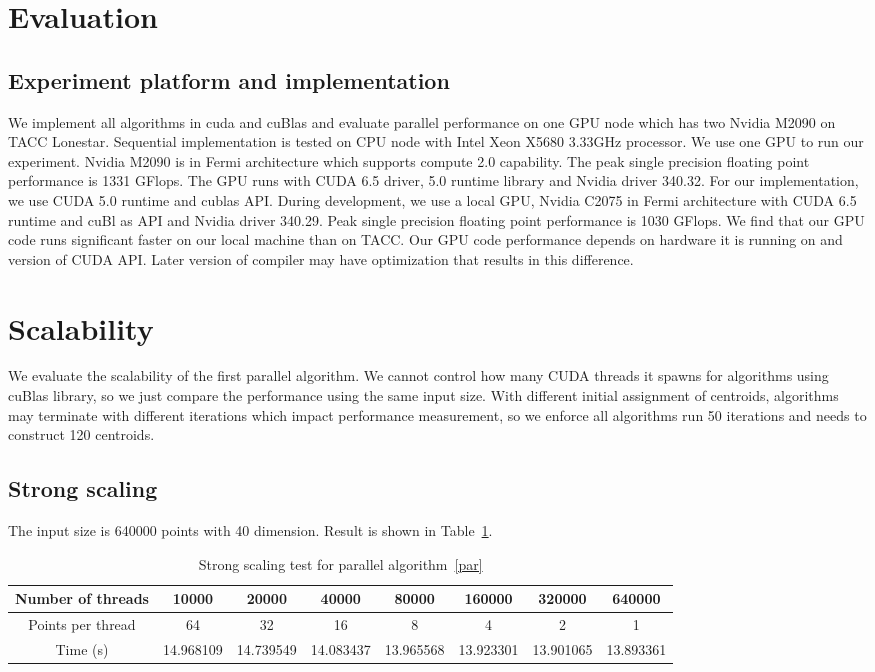 \section{Evaluation}
\subsection{Experiment platform and implementation}
We implement all algorithms in cuda and cuBlas and evaluate parallel performance on one GPU node which
has two Nvidia M2090 on TACC Lonestar. Sequential implementation is tested on CPU node with
Intel Xeon X5680 3.33GHz processor. We use one GPU to run our experiment. Nvidia M2090 is in Fermi
architecture which supports compute 2.0 capability. The peak single precision floating point performance
is 1331 GFlops. The GPU runs with CUDA 6.5 driver, 5.0
runtime library and Nvidia driver 340.32. For our implementation, we use CUDA 5.0 runtime and cublas API.
During development, we use a local GPU, Nvidia C2075 in Fermi architecture with CUDA 6.5 runtime and cuBl
as API and Nvidia driver 340.29. Peak single precision floating point performance is 1030 GFlops.
We find that our GPU code runs significant faster on our local machine than on TACC. Our GPU code
performance depends on hardware it is running on and version of CUDA API. Later version of compiler may
have optimization that results in this difference. 

\section{Scalability}
We evaluate the scalability of the first parallel algorithm. We cannot control how many CUDA threads it
spawns for algorithms using cuBlas library, so we just compare the performance using the same input size.
With different initial assignment of centroids, algorithms may terminate with different iterations which
impact performance measurement, so we enforce all algorithms run 50 iterations and needs to construct
120 centroids. 

\subsection{Strong scaling}
The input size is 640000 points with 40 dimension. Result is shown in Table~\ref{tab:strong-scaling}. 
\begin{table}[ht]
  \centering
  \begin{tabular}{|c|c|c|c|c|c|c|c|}
    \hline
    Number of threads	& 10000	    & 20000	    & 40000	& 80000	& 160000 & 320000	& 640000 \\
    \hline
    Points per thread &	64	      & 32	      & 16	  & 8	    & 4	     & 2	    & 1 \\
    \hline
    Time (s)	   & 14.968109 &	14.739549	& 14.083437	& 13.965568	& 13.923301	& 13.901065	& 13.893361\\
    \hline
  \end{tabular}
  \label{tab:strong-scaling}
  \caption{Strong scaling test for parallel algorithm~\ref{par}}
\end{table}
 
